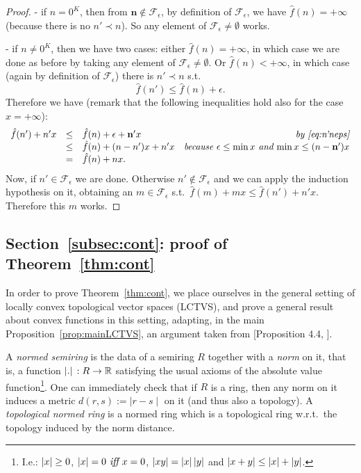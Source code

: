 \begin{proof}
- if $ n  =0^{K}$, then from $\mathbf  n\notin \mathcal F_{\epsilon}$, by definition of $\mathcal F_\epsilon$, we have $\hat f( n  )=+\infty$ (because there is no $ n  '\prec n  $).
So any element of $\mathcal F_\epsilon\neq\emptyset$ works.

- if $ n  \neq 0^{K}$, then we have two cases:
either $\hat f( n  )=+\infty$, in which case we are done as before by taking any element of $\mathcal F_\epsilon\neq\emptyset$.
Or $\hat f( n  )<+\infty$, in which case (again by definition of $\mathcal F_\epsilon$) there is $ n  '\prec n  $ s.t.\ \begin{equation}\label{eq:n'neps} \hat f( n  ')\leq \hat f( n  )+\epsilon.\end{equation}
Therefore we have (remark that the following inequalities hold also for the case $x=+\infty$):
\[\begin{array}{rclr}
 \hat f( n  ')+ n  ' x  & \leq & \hat f( n  ) + \epsilon +\mathbf  n' x  & \textit{by \eqref{eq:n'neps}} \\
 & \leq & \hat f( n  ) + ( n  - n  ') x  +  n  ' x  & \textit{because $\epsilon\leq\min x $ and $\min  x \leq( n  -\mathbf  n') x $} \\
 & = & \hat f( n  )+  n   x . &
\end{array}\]
Now, if $ n  '\in\mathcal F_\epsilon$ we are done.
Otherwise $ n  '\notin\mathcal F_\epsilon$ and we can apply the induction hypothesis on it, obtaining an $ m  \in\mathcal F_\epsilon$ s.t.\ $\hat f( m  )+ m   x  \leq \hat f( n  ')+ n  ' x $.
Therefore this $ m  $ works.
\end{proof}


\subsection{Section~\ref{subsec:cont}: proof of Theorem~\ref{thm:cont}}

In order to prove Theorem~\ref{thm:cont}, we place ourselves in the general setting of locally convex topological vector spaces (LCTVS), and prove a general result about convex functions in this setting, adapting, in the main Proposition~\ref{prop:mainLCTVS}, an argument taken from [Proposition 4.4, \cite{Cobzas2017}].

\begin{definition}
 A \emph{normed semiring} is the data of a semiring $R$ together with a \emph{norm} on it, that is, a function $\left\lvert.\right\rvert\,:R\to\mathbb{R}$ satisfying the usual axioms of the absolute value function\footnote{I.e.: $\left\lvert x\right\rvert\geq 0$, $\left\lvert x\right\rvert =0 \textit{ iff } x=0$, $\left\lvert xy\right\rvert=\left\lvert x\right\rvert\left\lvert y\right\rvert$ and $\left\lvert x+y\right\rvert\leq \left\lvert x\right\rvert+\left\lvert y\right\rvert$.}.
 One can immediately check that if $R$ is a ring, then any norm on it induces a metric $d(r,s):=\mid r-s\mid$ on it (and thus also a topology).
 A \emph{topological normed ring} is a normed ring which is a topological ring w.r.t.\ the topology induced by the norm distance.
\end{definition}

